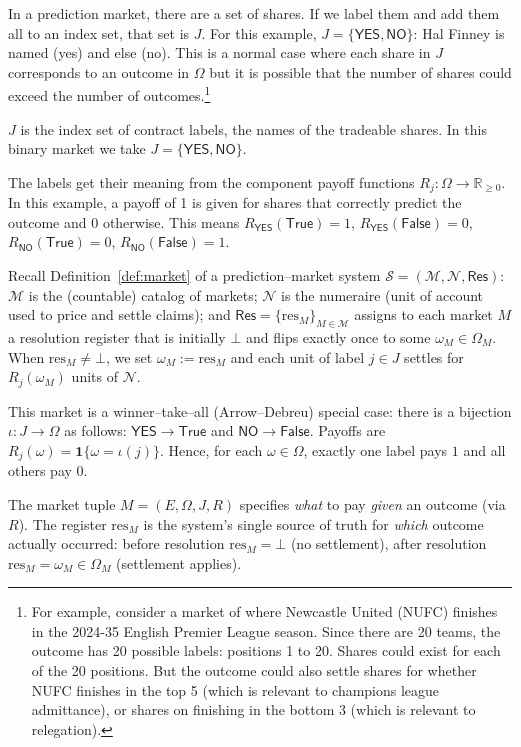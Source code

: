 In a prediction market, there are a set of shares. If we label them and add them all to an index set, that set is $J$. For this example, $J=\{\textsf{YES},\textsf{NO}\}$: Hal Finney is named (yes) and else (no). This is a normal case where each share in $J$ corresponds to an outcome in $\Omega$ but it is possible that the number of shares could exceed the number of outcomes.\footnote{For example, consider a market of where Newcastle United (NUFC) finishes in the 2024-35 English Premier League season. Since there are 20 teams, the outcome has 20 possible labels: positions 1 to 20. Shares could exist for each of the 20 positions. But the outcome could also settle shares for whether NUFC finishes in the top 5 (which is relevant to champions league admittance), or shares on finishing in the bottom 3 (which is relevant to relegation).}

$J$ is the index set of contract labels, the names of the tradeable shares. In this binary market we take $J=\{\textsf{YES},\textsf{NO}\}$. 

The labels get their meaning from the component payoff functions $R_j:\Omega\to\mathbb{R}_{\ge 0}$. In this example, a payoff of 1 is given for shares that correctly predict the outcome and 0 otherwise. This means $R_{\textsf{YES}}(\mathsf{True})=1$, $R_{\textsf{YES}}(\mathsf{False})=0$, $R_{\textsf{NO}}(\mathsf{True})=0$, $R_{\textsf{NO}}(\mathsf{False})=1$.

Recall Definition~\ref{def:market} of a prediction--market system $\mathcal{S}=(\mathcal{M},\mathcal{N},\mathsf{Res})$:
$\mathcal{M}$ is the (countable) catalog of markets; $\mathcal{N}$ is the numeraire (unit of account used to price and settle claims);
and $\mathsf{Res}=\{\mathrm{res}_M\}_{M\in\mathcal{M}}$ assigns to each market $M$ a resolution register that is initially
$\bot$ and flips exactly once to some $\omega_M\in\Omega_M$.
When $\mathrm{res}_M\neq\bot$, we set $\omega_M:=\mathrm{res}_M$ and each unit of label $j\in J$ settles for $R_j(\omega_M)$ units of $\mathcal{N}$.

This market is a winner--take--all (Arrow--Debreu) special case: there is a bijection $\iota:J\to\Omega$ as follows: $\textsf{YES}\rightarrow\mathsf{True}$ and $\textsf{NO}\rightarrow\mathsf{False}$. Payoffs are $R_j(\omega)=\mathbf{1}\{\omega=\iota(j)\}$. Hence, for each $\omega\in\Omega$, exactly one label pays $1$ and all others pay $0$. 

The market tuple $M=(E,\Omega,J,R)$ specifies \emph{what} to pay \emph{given} an outcome (via $R$).
The register $\mathrm{res}_M$ is the system’s single source of truth for \emph{which} outcome actually occurred:
before resolution $\mathrm{res}_M=\bot$ (no settlement), after resolution $\mathrm{res}_M=\omega_M\in\Omega_M$ (settlement applies).

